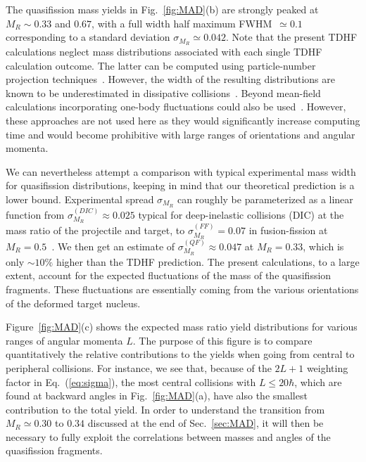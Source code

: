 \documentclass[reprint,aps,prc,twocolumn,floatfix,10pt]{revtex4-2}
\begin{document}
The quasifission mass yields in Fig.~\ref{fig:MAD}(b) are strongly peaked at $M_R\sim0.33$ and $0.67$,
with a full width half maximum FWHM~$\simeq0.1$ corresponding to a standard deviation $\sigma_{M_R}\simeq0.042$.
Note that the present TDHF calculations neglect mass distributions associated with each single TDHF calculation outcome.
The latter can be computed using particle-number projection techniques~\cite{simenel2010,sekizawa2013,scamps2013a,scamps2017b}.
However, the width of the resulting distributions are known to be underestimated in dissipative collisions~\cite{dasso1979}.
Beyond mean-field calculations incorporating one-body
fluctuations could also be used~\cite{simenel2011,williams2018,lacroix2014,ayik2015,ayik2015a,ayik2016,ayik2018,tanimura2017}.
However, these approaches are not used here as they would significantly increase computing time and would become prohibitive with large ranges of orientations and angular momenta.

We can nevertheless attempt a comparison with typical experimental mass width for quasifission distributions, keeping in mind that our theoretical prediction is a lower bound.
Experimental spread $\sigma_{M_R}$ can roughly be parameterized as a linear function from $\sigma_{M_R}^{(DIC)}\approx0.025$ typical for deep-inelastic collisions (DIC) at the mass ratio of the projectile and target, to $\sigma_{M_R}^{(FF)}=0.07$ in fusion-fission at $M_R=0.5$~\cite{durietz2011}.
We then get an estimate of $\sigma_{M_R}^{(QF)}\approx 0.047$ at $M_R=0.33$, which is only $\sim10\%$ higher than the TDHF prediction.
The present calculations, to a large extent, account for the expected fluctuations of the mass of the quasifission fragments.
These fluctuations are essentially coming from the various orientations of the deformed target nucleus.

Figure~\ref{fig:MAD}(c) shows the expected mass ratio yield distributions for various ranges of angular momenta $L$.
The purpose of this figure is to compare quantitatively the relative contributions to the yields when going from central to peripheral collisions.
For instance, we see that, because of the $2L+1$ weighting factor in Eq.~(\ref{eq:sigma}), the most central collisions with $L\le20\hbar$, which are found at backward angles in Fig.~\ref{fig:MAD}(a), have also the smallest contribution to the total yield.
In order to understand the transition from $M_R\simeq0.30$ to $0.34$ discussed at the end of Sec.~\ref{sec:MAD}, it will then be necessary to fully exploit the correlations between  masses and angles of the quasifission fragments.
\end{document}
